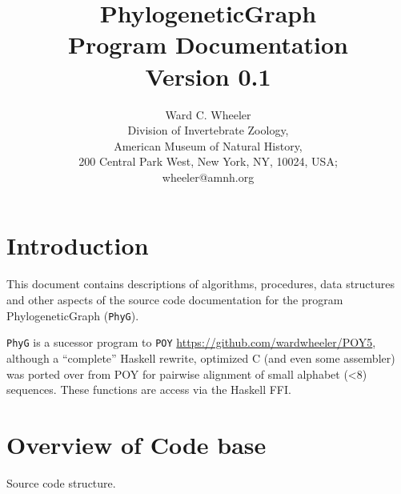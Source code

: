 \documentclass[11pt]{article}
\begin{document}
	
	\title{PhylogeneticGraph\\Program Documentation\\Version 0.1}
	\author{Ward C. Wheeler\\
		Division of Invertebrate Zoology,\\ American Museum of Natural History,\\ 200 Central Park West, New York, NY, 10024, USA;\\wheeler@amnh.org}
	
	
	\maketitle
	\newpage
	
	\tableofcontents
	\newpage
	\section{Introduction}
	This document contains descriptions of algorithms, procedures, data structures and other aspects of the 
	source code documentation for the program PhylogeneticGraph (\texttt{PhyG}).  
	
	 \texttt{PhyG} is a sucessor program to \texttt{POY} \citep{POY2,POY3,POY4,Varonetal2010,POY5, Wheeleretal2015} \url{https://github.com/wardwheeler/POY5}, 
	 although a ``complete'' Haskell rewrite, optimized C (and even some assembler) was ported over from POY for pairwise alignment of small alphabet (<8)
	 sequences.  These functions are access via the Haskell FFI.
	
	
	
	\section{Overview of Code base}
	Source code structure.
	
\end{document}
